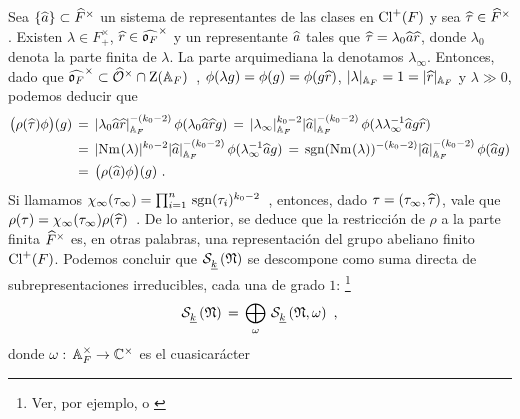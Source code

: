 Sea $\{\widehat{a}\}\subset\widehat{F}^{\times}$ un sistema de representantes de las clases
en ${\mathrm{Cl}^{+}(F)}$ y sea $\widehat{\tau}\in\widehat{F}^{\times}$. Existen
$\lambda\in F_{+}^{\times}$, $\widehat{r}\in\widehat{\mathfrak{o}_{F}}^{\times}$ y un representante
$\widehat{a}$ tales que $\widehat{\tau}=\lambda_{0}\widehat{a}\widehat{r}$, donde
$\lambda_{0}$ denota la parte finita de $\lambda$. La parte arquimediana la
denotamos $\lambda_{\infty}$. Entonces, dado que
\begin{math}
	\widehat{\mathfrak{o}_{F}}^{\times}\subset\widehat{\mathcal{O}}^{\times}\cap\mathrm{Z}(\mathbb{A}_{F})
\end{math}~, $\phi(\lambda g)=\phi(g)=\phi(g\widehat{r})$,
$|\lambda|_{\mathbb{A}_{F}}=1=|\widehat{r}|_{\mathbb{A}_{F}}$ y $\lambda\gg 0$, podemos
deducir que
\begin{align*}
	\big(\rho(\widehat{\tau})\phi\big)(g) & \,=\,
		|\lambda_{0}\widehat{a}\widehat{r}|_{\mathbb{A}_{F}}^{-(k_{0}-2)}\,
			\phi(\lambda_{0}\widehat{a}\widehat{r}g) \,=\,
		|\lambda_{\infty}|_{\mathbb{A}_{F}}^{k_{0}-2}
			|\widehat{a}|_{\mathbb{A}_{F}}^{-(k_{0}-2)}\,
			\phi(\lambda\lambda_{\infty}^{-1}\widehat{a}g\widehat{r}) \\
	& \,=\,|\mathrm{Nm}_{}(\lambda)|^{k_{0}-2}
		|\widehat{a}|_{\mathbb{A}_{F}}^{-(k_{0}-2)}\,
			\phi(\lambda_{\infty}^{-1}\widehat{a}g) \,=\,
		\mathrm{sgn}(\mathrm{Nm}_{}(\lambda))^{-(k_{0}-2)}
		|\widehat{a}|_{\mathbb{A}_{F}}^{-(k_{0}-2)}\,\phi(\widehat{a}g) \\
	& \,=\,\big(\rho(\widehat{a})\phi\big)(g)
	\text{ .}
\end{align*}
%
Si llamamos
\begin{math}
	\chi_{\infty}(\tau_{\infty})=\prod_{i=1}^{n}\,
		\mathrm{sgn}(\tau_{i})^{k_{0}-2}
\end{math}~, entonces, dado $\tau=(\tau_{\infty},\widehat{\tau})$, vale que
\begin{math}
	\rho(\tau)=\chi_{\infty}(\tau_{\infty})\rho(\widehat{\tau})
\end{math}~. De lo anterior, se deduce que la restricci\'{o}n de $\rho$ a la
parte finita $\widehat{F}^{\times}$ es, en otras palabras, una representaci\'{o}n del
grupo abeliano finito ${\mathrm{Cl}^{+}(F)}$. Podemos concluir que $\mathcal{S}^{}_{\underline{k}}\left(\mathfrak{N}\right)$
se descompone como suma directa de subrepresentaciones irreducibles, cada una
de grado $1$:%
\footnote{Ver, por ejemplo, \cite{Etingof} o \cite{SerreScott}}
\begin{equation}
	\label{eq:descomposicioncuspidalescuasicaracteres}
	\mathcal{S}^{}_{\underline{k}}\left(\mathfrak{N}\right) \,=\,\bigoplus_{\omega}\,
		\mathcal{S}^{}_{\underline{k}}\left(\mathfrak{N},\omega\right)
	\text{ ,}
\end{equation}
%
donde
\begin{math}
	\omega:\,\mathbb{A}_{F}^{\times}\rightarrow\mathbb{C}^{\times}
\end{math} es el cuasicar\'{a}cter
